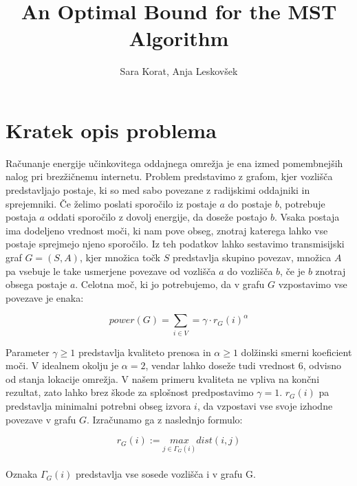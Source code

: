 \documentclass[a4paper]{report}
\newcommand{\subtitle}[1]{%
  \posttitle{%
    \par\end{center}
    \begin{center}\large#1\end{center}
    \vskip3em}%
}
\begin{document}
\title{\textbf{\huge{An Optimal Bound for the MST Algorithm}}}
\subtitle{\textbf{\large{poročilo, 2. skupina}}}
\author{Sara Korat, Anja Leskovšek}


\maketitle 
\pagebreak

\tableofcontents

\pagebreak

\section{Kratek opis problema}

Računanje energije učinkovitega oddajnega omrežja je ena izmed pomembnejših nalog pri brezžičnemu internetu. Problem predstavimo z grafom, kjer vozlišča predstavljajo postaje, ki so med sabo povezane z radijskimi oddajniki in sprejemniki. Če želimo poslati sporočilo iz postaje $a$ do postaje $b$, potrebuje postaja $a$ oddati sporočilo z dovolj energije, da doseže postajo $b$. Vsaka postaja ima dodeljeno vrednost moči, ki nam pove obseg, znotraj katerega lahko vse postaje sprejmejo njeno sporočilo. Iz teh podatkov lahko sestavimo transmisijski graf $ G = (S, A)$, kjer množica točk $S$ predstavlja skupino povezav, množica $A$ pa vsebuje le take usmerjene povezave od vozlišča $a$ do vozlišča $b$, če je $b$ znotraj obsega postaje $a$. Celotna moč, ki jo potrebujemo, da v grafu $G$ vzpostavimo vse povezave je enaka: 

$$ power(G) = \sum_{i\in V} = \gamma \cdot r_G(i)^{\alpha} $$

Parameter $ \gamma \geq 1 $ predstavlja kvaliteto prenosa in $ \alpha \geq 1 $ dolžinski smerni koeficient moči. V idealnem okolju je $ \alpha = 2 $, vendar lahko doseže tudi vrednost 6, odvisno od stanja lokacije omrežja. V našem primeru kvaliteta ne vpliva na končni rezultat, zato lahko brez škode za splošnost predpostavimo $\gamma=1$. $r_G(i)$ pa predstavlja minimalni potrebni obseg izvora $i$, da vzpostavi vse svoje izhodne povezave v grafu $G$. Izračunamo ga z naslednjo formulo:

$$r_G(i) := \underset{j \in \Gamma_G(i)}{max} dist(i,j) $$
\\
Oznaka $ \Gamma_G(i) $ predstavlja vse sosede vozlišča i v grafu G.
\\
\end{document}
